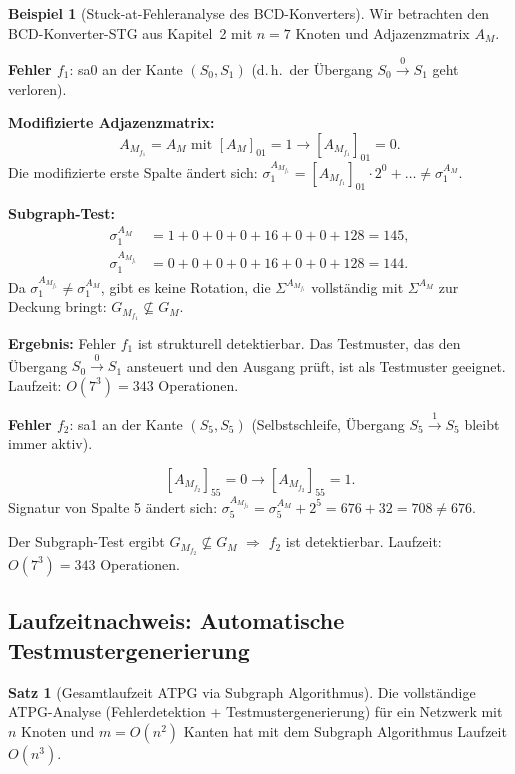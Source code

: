 ﻿\documentclass[a4paper,12pt]{article}
\theoremstyle{definition}
\newtheorem{beispiel}{Beispiel}
\newtheorem{satz}{Satz}
\begin{document}
\begin{beispiel}[Stuck-at-Fehleranalyse des BCD-Konverters]\label{bsp:atpg_bcd}
  Wir betrachten den BCD-Konverter-STG aus Kapitel~2 mit $n = 7$ Knoten und
  Adjazenzmatrix $A_M$.

  \textbf{Fehler $f_1$}: sa0 an der Kante $(S_0, S_1)$ (d.\,h.\ der Übergang
  $S_0 \xrightarrow{0} S_1$ geht verloren).

  \textbf{Modifizierte Adjazenzmatrix:}
  \[
    A_{M_{f_1}} = A_M \text{ mit } [A_M]_{01} = 1 \to [A_{M_{f_1}}]_{01} = 0.
  \]
  Die modifizierte erste Spalte ändert sich:
  $\sigma_1^{A_{M_{f_1}}} = [A_{M_{f_1}}]_{01} \cdot 2^0 + \ldots \neq \sigma_1^{A_M}$.

  \textbf{Subgraph-Test:}
  \begin{align*}
    \sigma_1^{A_M} &= 1 + 0 + 0 + 0 + 16 + 0 + 0 + 128 = 145, \\
    \sigma_1^{A_{M_{f_1}}} &= 0 + 0 + 0 + 0 + 16 + 0 + 0 + 128 = 144.
  \end{align*}
  Da $\sigma_1^{A_{M_{f_1}}} \neq \sigma_1^{A_M}$, gibt es keine Rotation, die
  $\Sigma^{A_{M_{f_1}}}$ vollständig mit $\Sigma^{A_M}$ zur Deckung bringt:
  $G_{M_{f_1}} \not\subseteq G_M$.

  \textbf{Ergebnis:} Fehler $f_1$ ist strukturell detektierbar. Das Testmuster, das
  den Übergang $S_0 \xrightarrow{0} S_1$ ansteuert und den Ausgang prüft, ist als
  Testmuster geeignet. Laufzeit: $O(7^3) = 343$ Operationen.

  \textbf{Fehler $f_2$}: sa1 an der Kante $(S_5, S_5)$ (Selbstschleife, Übergang
  $S_5 \xrightarrow{1} S_5$ bleibt immer aktiv).

  \[
    [A_{M_{f_2}}]_{55} = 0 \to [A_{M_{f_2}}]_{55} = 1.
  \]
  Signatur von Spalte 5 ändert sich: $\sigma_5^{A_{M_{f_2}}} = \sigma_5^{A_M} + 2^5 = 676 + 32
  = 708 \neq 676$.

  Der Subgraph-Test ergibt $G_{M_{f_2}} \not\subseteq G_M$ $\Rightarrow$ $f_2$ ist
  detektierbar. Laufzeit: $O(7^3) = 343$ Operationen.
\end{beispiel}

\subsection{Laufzeitnachweis: Automatische Testmustergenerierung}

\begin{satz}[Gesamtlaufzeit ATPG via Subgraph Algorithmus]\label{satz:atpglaufzeit}
  Die vollständige ATPG-Analyse (Fehlerdetektion + Testmustergenerierung) für ein
  Netzwerk mit $n$ Knoten und $m = O(n^2)$ Kanten hat mit dem Subgraph Algorithmus
  Laufzeit $O(n^3)$.
\end{satz}
\end{document}
